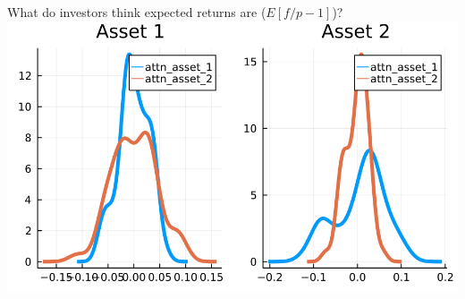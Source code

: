 \documentclass[
  ignorenonframetext,
]{beamer}
\begin{document}
\begin{frame}{What do investors think expected returns are
(\(E[f/p - 1]\))?}
\includegraphics[width=0.4\paperheight]{complexity_files/figure-beamer/unnamed-chunk-16-4}
\end{frame}
\end{document}
